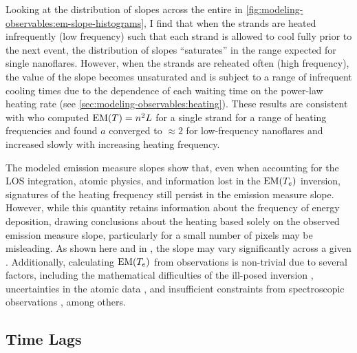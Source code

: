 Looking at the distribution of slopes across the entire \AR{} in \autoref{fig:modeling-observables:em-slope-histograms}, I find that when the strands are heated infrequently (low frequency) such that each strand is allowed to cool fully prior to the next event, the distribution of slopes ``saturates'' in the range expected for single nanoflares. However, when the strands are reheated often (high frequency), the value of the slope becomes unsaturated and is subject to a range of infrequent cooling times due to the dependence of each waiting time on the power-law heating rate (see \autoref{sec:modeling-observables:heating}). These results are consistent with \citet{cargill_active_2014} who computed $\emd[T]=n^2L$ for a single strand for a range of heating frequencies and found $a$ converged to $\approx2$ for low-frequency nanoflares and increased slowly with increasing heating frequency.

The modeled emission measure slopes show that, even when accounting for the LOS integration, atomic physics, and information lost in the $\emd$ inversion, signatures of the heating frequency still persist in the emission measure slope. However, while this quantity retains information about the frequency of energy deposition, drawing conclusions about the heating based solely on the observed emission measure slope, particularly for a small number of pixels may be misleading. As shown here and in \citet{del_zanna_evolution_2015}, the slope may vary significantly across a given \AR{}. Additionally, calculating $\emd$ from observations is non-trivial due to several factors, including the mathematical difficulties of the ill-posed inversion \citep{craig_fundamental_1976,judge_failure_1995,judge_fundamental_1997}, uncertainties in the atomic data \citep{guennou_can_2013}, and insufficient constraints from spectroscopic observations \citep[e.g.][]{landi_isothermality_2010,winebarger_defining_2012}, among others.

\subsection{Time Lags}\label{sec:modeling-observables:timelags}

